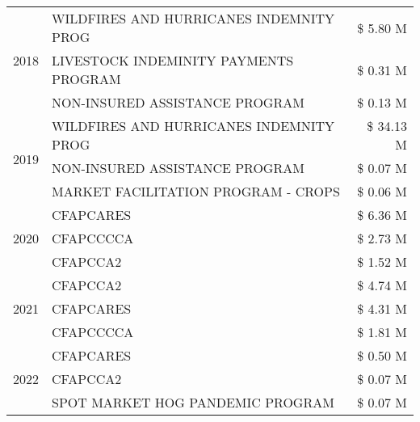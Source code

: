 \begin{tabular}{llr}
\cline{1-3}
\multirow[t]{3}{*}{2018} & WILDFIRES AND HURRICANES INDEMNITY PROG & \$ 5.80 M \\
 & LIVESTOCK INDEMINITY PAYMENTS PROGRAM & \$ 0.31 M \\
 & NON-INSURED ASSISTANCE PROGRAM & \$ 0.13 M \\
\cline{1-3}
\multirow[t]{3}{*}{2019} & WILDFIRES AND HURRICANES INDEMNITY PROG & \$ 34.13 M \\
 & NON-INSURED ASSISTANCE PROGRAM & \$ 0.07 M \\
 & MARKET FACILITATION PROGRAM - CROPS & \$ 0.06 M \\
\cline{1-3}
\multirow[t]{3}{*}{2020} & CFAPCARES & \$ 6.36 M \\
 & CFAPCCCCA & \$ 2.73 M \\
 & CFAPCCA2 & \$ 1.52 M \\
\cline{1-3}
\multirow[t]{3}{*}{2021} & CFAPCCA2 & \$ 4.74 M \\
 & CFAPCARES & \$ 4.31 M \\
 & CFAPCCCCA & \$ 1.81 M \\
\cline{1-3}
\multirow[t]{3}{*}{2022} & CFAPCARES & \$ 0.50 M \\
 & CFAPCCA2 & \$ 0.07 M \\
 & SPOT MARKET HOG PANDEMIC PROGRAM & \$ 0.07 M \\
\cline{1-3}
\bottomrule
\end{tabular}
